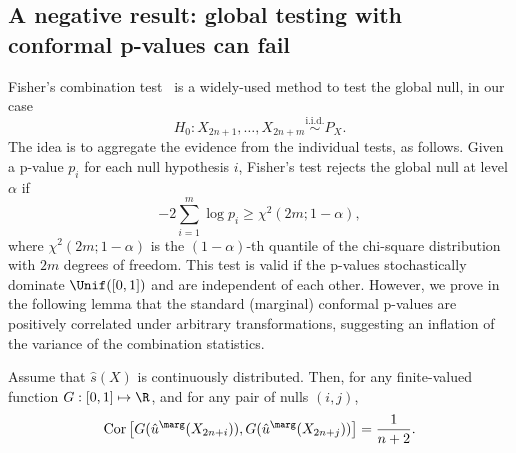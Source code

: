 \subsection{A negative result: global testing with conformal p-values can fail} \label{sec:fisher}

Fisher's combination test~\citep{fisher1925statistical} is a widely-used method to test the global null, in our case
$$
H_{0}: X_{2n+1}, \ldots, X_{2n + m}\stackrel{\mathrm{i.i.d.}}{\sim} P_{X}.
$$
The idea is to aggregate the evidence from the individual tests, as follows. Given a p-value $p_i$ for each null hypothesis $i$, Fisher's test rejects the global null at level $\alpha$ if
\[-2 \sum_{i=1}^{m} \log p_{i} \ge \chi^2(2m; 1 - \alpha),\]
where $\chi^2(2m; 1 - \alpha)$ is the $(1 - \alpha)$-th quantile of the chi-square distribution with $2m$ degrees of freedom.
This test is valid if the p-values stochastically dominate $\Unif([0, 1])$ and are independent of each other. However, we prove in the following lemma that the standard (marginal) conformal p-values are positively correlated under arbitrary transformations, suggesting an inflation of the variance of the combination statistics.

\begin{lemma}\label{lem:pairwise_correlation}
Assume that $\hat{s}(X)$ is continuously distributed. Then, for any finite-valued function $G: [0, 1]\mapsto \R$, and for any pair of nulls $(i, j)$,
\[\mathrm{Cor}\left[ G(\hat{u}^\marg(X_{2n+i})), G(\hat{u}^\marg(X_{2n+j})) \right] = \frac{1}{n+2}.\]
\end{lemma}

